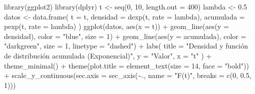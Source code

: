 \documentclass[
  letterpaper,
  DIV=11,
  numbers=noendperiod]{scrartcl}
\newenvironment{Shaded}{\begin{snugshade}}{\end{snugshade}}
\newcommand{\AttributeTok}[1]{\textcolor[rgb]{0.40,0.45,0.13}{#1}}
\newcommand{\DecValTok}[1]{\textcolor[rgb]{0.68,0.00,0.00}{#1}}
\newcommand{\FloatTok}[1]{\textcolor[rgb]{0.68,0.00,0.00}{#1}}
\newcommand{\FunctionTok}[1]{\textcolor[rgb]{0.28,0.35,0.67}{#1}}
\newcommand{\NormalTok}[1]{\textcolor[rgb]{0.00,0.23,0.31}{#1}}
\newcommand{\OtherTok}[1]{\textcolor[rgb]{0.00,0.23,0.31}{#1}}
\newcommand{\SpecialCharTok}[1]{\textcolor[rgb]{0.37,0.37,0.37}{#1}}
\newcommand{\StringTok}[1]{\textcolor[rgb]{0.13,0.47,0.30}{#1}}
\begin{document}
\begin{Shaded}
\begin{Highlighting}[]
\FunctionTok{library}\NormalTok{(ggplot2)}
\FunctionTok{library}\NormalTok{(dplyr)}
\NormalTok{t }\OtherTok{\textless{}{-}} \FunctionTok{seq}\NormalTok{(}\DecValTok{0}\NormalTok{, }\DecValTok{10}\NormalTok{, }\AttributeTok{length.out =} \DecValTok{400}\NormalTok{)}
\NormalTok{lambda }\OtherTok{\textless{}{-}} \FloatTok{0.5}
\NormalTok{datos }\OtherTok{\textless{}{-}} \FunctionTok{data.frame}\NormalTok{(}
  \AttributeTok{t =}\NormalTok{ t,}
  \AttributeTok{densidad =} \FunctionTok{dexp}\NormalTok{(t, }\AttributeTok{rate =}\NormalTok{ lambda),}
  \AttributeTok{acumulada =} \FunctionTok{pexp}\NormalTok{(t, }\AttributeTok{rate =}\NormalTok{ lambda)}
\NormalTok{)}
\FunctionTok{ggplot}\NormalTok{(datos, }\FunctionTok{aes}\NormalTok{(}\AttributeTok{x =}\NormalTok{ t)) }\SpecialCharTok{+}
  \FunctionTok{geom\_line}\NormalTok{(}\FunctionTok{aes}\NormalTok{(}\AttributeTok{y =}\NormalTok{ densidad), }\AttributeTok{color =} \StringTok{"blue"}\NormalTok{, }\AttributeTok{size =} \DecValTok{1}\NormalTok{) }\SpecialCharTok{+}
  \FunctionTok{geom\_line}\NormalTok{(}\FunctionTok{aes}\NormalTok{(}\AttributeTok{y =}\NormalTok{ acumulada), }\AttributeTok{color =} \StringTok{"darkgreen"}\NormalTok{, }\AttributeTok{size =} \DecValTok{1}\NormalTok{, }\AttributeTok{linetype =} \StringTok{"dashed"}\NormalTok{) }\SpecialCharTok{+}
  \FunctionTok{labs}\NormalTok{(}
    \AttributeTok{title =} \StringTok{"Densidad y función de distribución acumulada (Exponencial)"}\NormalTok{,}
    \AttributeTok{y =} \StringTok{"Valor"}\NormalTok{,}
    \AttributeTok{x =} \StringTok{"t"}
\NormalTok{  ) }\SpecialCharTok{+}
  \FunctionTok{theme\_minimal}\NormalTok{() }\SpecialCharTok{+}
  \FunctionTok{theme}\NormalTok{(}\AttributeTok{plot.title =} \FunctionTok{element\_text}\NormalTok{(}\AttributeTok{size =} \DecValTok{14}\NormalTok{, }\AttributeTok{face =} \StringTok{"bold"}\NormalTok{)) }\SpecialCharTok{+}
  \FunctionTok{scale\_y\_continuous}\NormalTok{(}\AttributeTok{sec.axis =} \FunctionTok{sec\_axis}\NormalTok{(}\SpecialCharTok{\textasciitilde{}}\NormalTok{., }\AttributeTok{name =} \StringTok{"F(t)"}\NormalTok{, }\AttributeTok{breaks =} \FunctionTok{c}\NormalTok{(}\DecValTok{0}\NormalTok{, }\FloatTok{0.5}\NormalTok{, }\DecValTok{1}\NormalTok{)))}
\end{Highlighting}
\end{Shaded}
\end{document}

